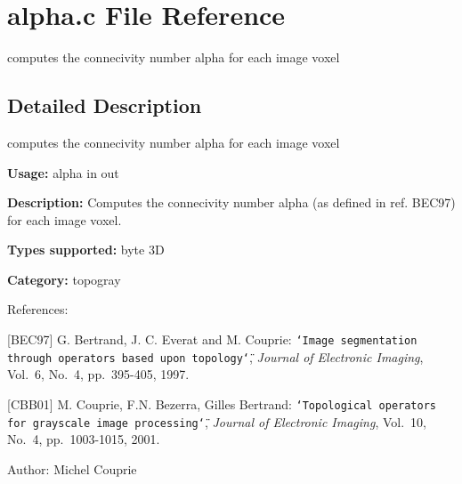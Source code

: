 \section{alpha.c File Reference}
\label{alpha_8c}
computes the connecivity number alpha for each image voxel  




\label{_details}
\subsection{Detailed Description}
computes the connecivity number alpha for each image voxel 

{\bf Usage:} alpha in out

{\bf Description:} Computes the connecivity number alpha (as defined in ref. BEC97) for each image voxel.

{\bf Types supported:} byte 3D

{\bf Category:} topogray

References:

[BEC97] G. Bertrand, J. C. Everat and M. Couprie: {\tt \char`\"{}Image segmentation through operators based upon topology\char`\"{}}, {\em  Journal of Electronic Imaging\/}, Vol.~6, No.~4, pp.~395-405, 1997.

[CBB01] M. Couprie, F.N. Bezerra, Gilles Bertrand: {\tt \char`\"{}Topological operators for grayscale image processing\char`\"{}}, {\em  Journal of Electronic Imaging\/}, Vol.~10, No.~4, pp.~1003-1015, 2001.

\begin{Desc}
\item[Author:]Michel Couprie \end{Desc}
